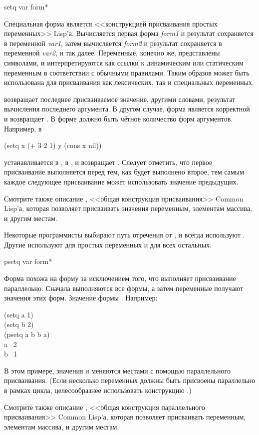 \begin{defspec}
setq {var form}*

Специальная форма  является <<конструкцией присваивания простых переменных>> Lisp'а.
Вычисляется первая форма \emph{form1} и результат сохраняется в переменной
\emph{var1}, затем вычисляется \emph{form2} и результат сохраняется в переменной
\emph{var2}, и так далее.
Переменные, конечно же, представлены символами, и интерпретируются как ссылки к
динамическим или статическим переменным в соответствии с обычными правилами.
Таким образов  может быть использована для присваивания как
лексических, так и специальных переменных.

 возвращает последнее присваиваемое значение, другими словами,
результат вычисления последнего аргумента.
В другом случае, форма  является корректной и возвращает {\false}.
В форме должно быть чётное количество форм аргументов.
Например, в 
\begin{lisp}
(setq x (+ 3 2 1) y (cons x nil))
\end{lisp}
 устанавливается в ,  в , и  возвращает
. Следует отметить, что первое присваивание выполняется перед тем, как
будет выполнено второе, тем самым каждое следующее присваивание может
использовать значение предыдущих.

\begin{newer}
Смотрите также описание , <<общая конструкция
присваивания>> Common Lisp'а, которая позволяет присваивать значения переменным,
элементам массива, и другим местам.

Некоторые программисты выбирают путь отречения от , и всегда используют
. Другие используют  для простых переменных и  для
всех остальных.
\end{newer}
\end{defspec}

\begin{defmac}
psetq {var form}*

Форма  похожа на форму  за исключением того, что выполняет
присваивание параллельно. Сначала выполняются все формы, а затем переменные
получают значения этих форм. Значение формы  {\false}.
Например:
\begin{lisp}
(setq a 1) \\
(setq b 2) \\
(psetq a b  b a) \\
a \EV\ 2 \\
b \EV\ 1
\end{lisp}
В этом примере, значения  и  меняются местами с помощью
параллельного присваивания.
(Если несколько переменных должны быть присвоены параллельно в рамках цикла,
целесообразнее использовать конструкцию .)

Смотрите также описание , <<общая конструкция параллельного
присваивания>> Common Lisp'а, которая позволяет присваивать переменным,
элементам массива, и другим местам.
\end{defmac}

